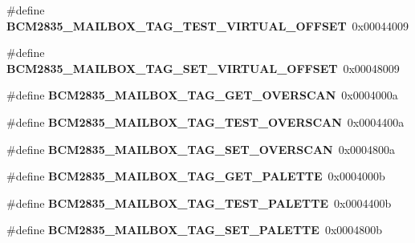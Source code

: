 \begin{DoxyCompactItemize}
\item 
\mbox{\label{group__raspberrypi__vc_ga22dcc5c52e9da33508718356945daf78}} 
\#define {\bfseries B\+C\+M2835\+\_\+\+M\+A\+I\+L\+B\+O\+X\+\_\+\+T\+A\+G\+\_\+\+T\+E\+S\+T\+\_\+\+V\+I\+R\+T\+U\+A\+L\+\_\+\+O\+F\+F\+S\+ET}~0x00044009
\item 
\mbox{\label{group__raspberrypi__vc_ga22f6af3770ab8701c937ae65afc5bd43}} 
\#define {\bfseries B\+C\+M2835\+\_\+\+M\+A\+I\+L\+B\+O\+X\+\_\+\+T\+A\+G\+\_\+\+S\+E\+T\+\_\+\+V\+I\+R\+T\+U\+A\+L\+\_\+\+O\+F\+F\+S\+ET}~0x00048009
\item 
\mbox{\label{group__raspberrypi__vc_ga7e0ccc9a95dd3e6b5145ec1e775fd345}} 
\#define {\bfseries B\+C\+M2835\+\_\+\+M\+A\+I\+L\+B\+O\+X\+\_\+\+T\+A\+G\+\_\+\+G\+E\+T\+\_\+\+O\+V\+E\+R\+S\+C\+AN}~0x0004000a
\item 
\mbox{\label{group__raspberrypi__vc_ga6e7ef4b6a791badecb8061c518ef06b7}} 
\#define {\bfseries B\+C\+M2835\+\_\+\+M\+A\+I\+L\+B\+O\+X\+\_\+\+T\+A\+G\+\_\+\+T\+E\+S\+T\+\_\+\+O\+V\+E\+R\+S\+C\+AN}~0x0004400a
\item 
\mbox{\label{group__raspberrypi__vc_ga6c22e8565bc613aa2e267df833f5d8b2}} 
\#define {\bfseries B\+C\+M2835\+\_\+\+M\+A\+I\+L\+B\+O\+X\+\_\+\+T\+A\+G\+\_\+\+S\+E\+T\+\_\+\+O\+V\+E\+R\+S\+C\+AN}~0x0004800a
\item 
\mbox{\label{group__raspberrypi__vc_ga195dbcab42622cbfbb72e270274c8806}} 
\#define {\bfseries B\+C\+M2835\+\_\+\+M\+A\+I\+L\+B\+O\+X\+\_\+\+T\+A\+G\+\_\+\+G\+E\+T\+\_\+\+P\+A\+L\+E\+T\+TE}~0x0004000b
\item 
\mbox{\label{group__raspberrypi__vc_gaa00e46906810a31d2654d19c6ad6e44a}} 
\#define {\bfseries B\+C\+M2835\+\_\+\+M\+A\+I\+L\+B\+O\+X\+\_\+\+T\+A\+G\+\_\+\+T\+E\+S\+T\+\_\+\+P\+A\+L\+E\+T\+TE}~0x0004400b
\item 
\mbox{\label{group__raspberrypi__vc_gae0db6c0ec3eddf6542a1427b03c211c6}} 
\#define {\bfseries B\+C\+M2835\+\_\+\+M\+A\+I\+L\+B\+O\+X\+\_\+\+T\+A\+G\+\_\+\+S\+E\+T\+\_\+\+P\+A\+L\+E\+T\+TE}~0x0004800b

\end{DoxyCompactItemize}

